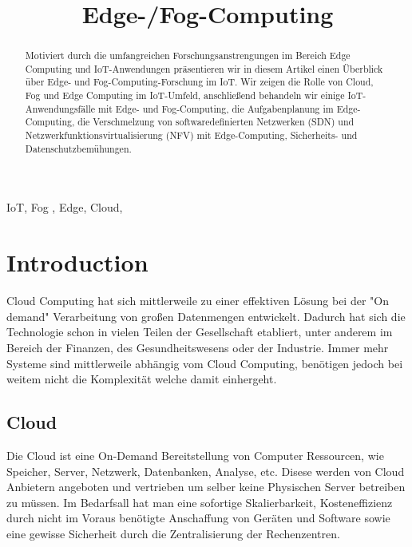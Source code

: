 \documentclass[conference]{IEEEtran}
\begin{document}
\title{Edge-/Fog-Computing\\
}

\author{
\and
{}
}

\maketitle

\begin{abstract}
Motiviert durch die umfangreichen Forschungsanstrengungen im Bereich Edge Computing und IoT-Anwendungen präsentieren wir in diesem Artikel einen Überblick über Edge- und Fog-Computing-Forschung im IoT. Wir zeigen die Rolle von Cloud, Fog und Edge Computing im IoT-Umfeld, anschließend behandeln wir einige IoT-Anwendungsfälle mit Edge- und Fog-Computing, die Aufgabenplanung im Edge-Computing, die Verschmelzung von softwaredefinierten Netzwerken (SDN) und Netzwerkfunktionsvirtualisierung (NFV) mit Edge-Computing, Sicherheits- und Datenschutzbemühungen.
\end{abstract}

\begin{IEEEkeywords}
IoT, Fog , Edge, Cloud, 
\end{IEEEkeywords}

\section{Introduction}
Cloud Computing hat sich mittlerweile zu einer effektiven Lösung bei der "On demand" Verarbeitung von großen Datenmengen entwickelt. Dadurch hat sich die Technologie schon in vielen Teilen der Gesellschaft etabliert, unter anderem im Bereich der Finanzen, des Gesundheitswesens oder der Industrie. Immer mehr Systeme sind mittlerweile abhängig vom Cloud Computing, benötigen jedoch bei weitem nicht die Komplexität welche damit einhergeht.

\subsection{Cloud}
Die Cloud ist eine On-Demand Bereitstellung von Computer Ressourcen, wie Speicher, Server, Netzwerk, Datenbanken, Analyse, etc. Disese werden von Cloud Anbietern angeboten und vertrieben um selber keine Physischen Server betreiben zu müssen. Im Bedarfsall hat man eine sofortige Skalierbarkeit, Kosteneffizienz durch nicht im Voraus benötigte Anschaffung von Geräten und Software sowie eine gewisse Sicherheit durch die Zentralisierung der Rechenzentren.
\end{document}
